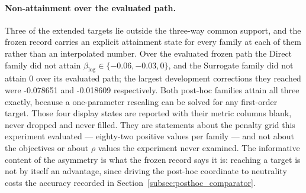 \documentclass[10pt]{article}
\theoremstyle{definition}
\newcommand{\1}{\mathbf{1}}
\begin{document}
\paragraph{Non-attainment over the evaluated path.}
Three of the extended targets lie outside the three-way common support, and the frozen
record carries an explicit attainment state for every family at each of them rather than an
interpolated number. Over the evaluated frozen path the Direct family did not attain
$\beta_{\log}\in\{-0.06,-0.03,0\}$, and the Surrogate family did not attain $0$ over its evaluated
path; the largest development corrections they reached were -0.078651 and
-0.018609 respectively. Both post-hoc families attain all three exactly, because a
one-parameter rescaling can be solved for any first-order target. Those four display states are
reported with their metric columns blank, never dropped and never filled. They are statements about
the penalty grid this experiment evaluated --- eighty-two positive values per family --- and not
about the objectives or about $\rho$ values the experiment never examined. The informative content
of the asymmetry is what the frozen record says it is: reaching a target is not by itself an
advantage, since driving the post-hoc coordinate to neutrality costs the accuracy recorded in
Section~\ref{subsec:posthoc_comparator}.
\end{document}

